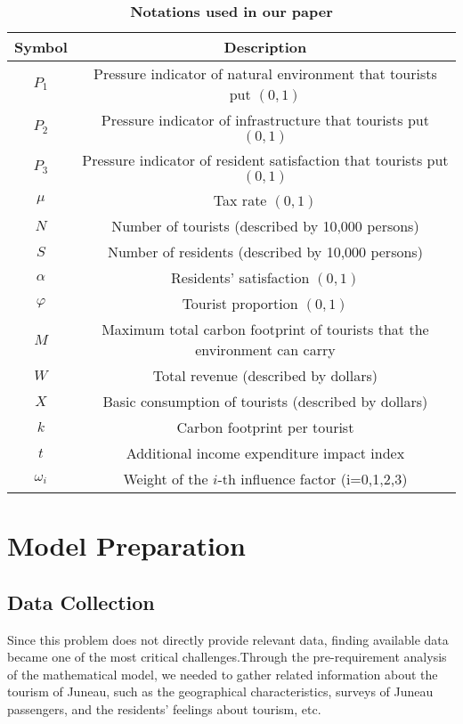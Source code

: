 \documentclass{mcmthesis}
\begin{document}
\begin{table}[H]
    \centering
    \caption{\textbf{Notations used in our paper}}\label{tab:notations}
    \begin{tabular}{cc}
        \toprule
        \textbf{Symbol} & \textbf{Description} \\
        \midrule
        $P_1$ & Pressure indicator of natural environment that tourists put $(0,1)$  \\
        $P_2$ & Pressure indicator of infrastructure that tourists put $(0,1)$  \\
        $P_3$ & Pressure indicator of resident satisfaction that tourists put $(0,1)$ \\
        $\mu$ & Tax rate $(0,1)$ \\
        $N$ & Number of tourists (described by 10,000 persons) \\
        $S$ & Number of residents (described by 10,000 persons) \\
        $\alpha$ & Residents' satisfaction $(0,1)$ \\
        $\varphi$ & Tourist proportion $(0,1)$ \\
        $M$ & Maximum total carbon footprint of tourists that the environment can carry \\
        $W$ & Total revenue (described by dollars) \\
        $X$ & Basic consumption of tourists (described by dollars) \\
        $k$ & Carbon footprint per tourist \\
        $t$ & Additional income expenditure impact index \\
        $\omega_i$ & Weight of the $i$-th influence factor (i=0,1,2,3)\\
        \bottomrule
    \end{tabular}
\end{table}


\section{Model Preparation}
\subsection{Data Collection}
{Since this problem does not directly provide relevant data, finding available data became one of the most critical challenges.Through the pre-requirement analysis of the mathematical model, we needed to gather related information about the tourism of Juneau, such as the geographical characteristics, surveys of Juneau passengers, and the residents' feelings about tourism, etc.}
\end{document}
